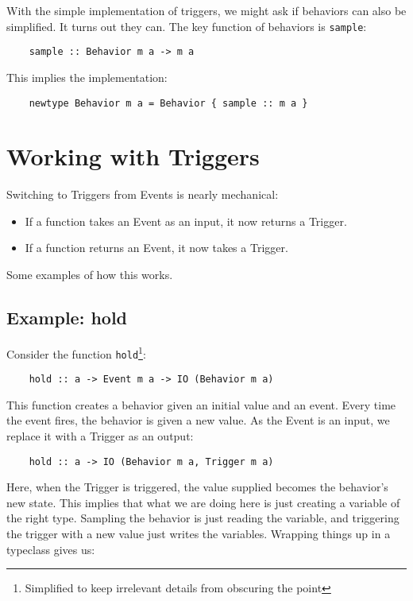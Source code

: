 \documentclass{article}
\begin{document}
With the simple implementation of triggers, we might ask if behaviors
can also be simplified.  It turns out they can.  The key function of
behaviors is \verb|sample|:

\begin{verbatim}
    sample :: Behavior m a -> m a
\end{verbatim}

This implies the implementation:

\begin{verbatim}
    newtype Behavior m a = Behavior { sample :: m a }
\end{verbatim}

\section{Working with Triggers}

Switching to Triggers from Events is nearly mechanical:

\begin{itemize}
\item If a function takes an Event as an input, it now returns a
Trigger.
\item If a function returns an Event, it now takes a Trigger.
\end{itemize}

Some examples of how this works.

\subsection{Example: hold}

Consider the function \verb|hold|\footnote{Simplified to keep irrelevant
details from obscuring the point}:

\begin{verbatim}
    hold :: a -> Event m a -> IO (Behavior m a)
\end{verbatim}

This function creates a behavior given an initial value and an event.
Every time the event fires, the behavior is given a new value.  As the
Event is an input, we replace it with a Trigger as an output:

\begin{verbatim}
    hold :: a -> IO (Behavior m a, Trigger m a)
\end{verbatim}

Here, when the Trigger is triggered, the value supplied becomes the
behavior's new state.  This implies that what we are doing here is just
creating a variable of the right type.  Sampling the behavior is just
reading the variable, and triggering the trigger with a new value just
writes the variables.  Wrapping things up in a typeclass gives us:
\end{document}
